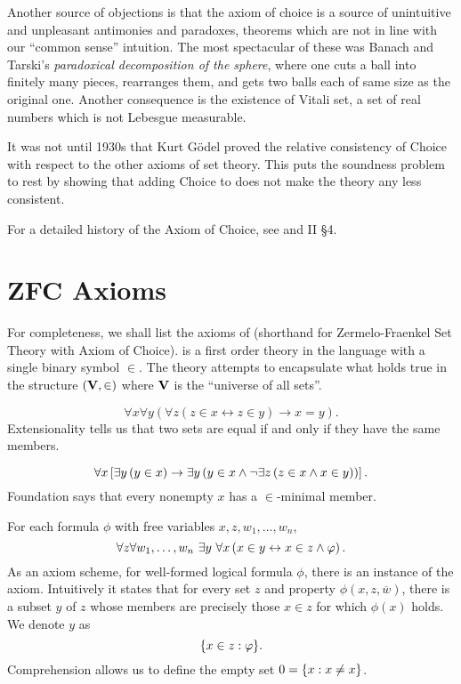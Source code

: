 Another source of objections is that the axiom of choice is a source of unintuitive and unpleasant antimonies and paradoxes,
theorems which are not in line with our ``common sense'' intuition.
The most spectacular of these was Banach and Tarski's \emph{paradoxical decomposition of the sphere},
where one cuts a ball into finitely many pieces, rearranges them, and gets two balls each of same size as the original one.
Another consequence is the existence of Vitali set, a set of real numbers which is not Lebesgue measurable.

It was not until 1930s that Kurt Gödel proved the relative consistency of Choice with respect to the other axioms of set theory.
This puts the soundness problem to rest by showing that adding Choice to \ZF does not make the theory any less consistent.

For a detailed history of the Axiom of Choice, see \autocite{moore1982} and \autocite{fraenkel1973} II \S 4.


\section{ZFC Axioms}

For completeness, we shall list the axioms of \ZFC (shorthand for Zermelo-Fraenkel Set Theory with Axiom of Choice).
\ZFC is a first order theory in the language with a single binary symbol \(\in\).
The theory attempts to encapsulate what holds true in the structure \((\mathbf{V},\in)\) where \(\mathbf{V}\) is the ``universe of all sets''.

\begin{axiom}[Extensionality]
    \[ \forall x \forall y \left( \forall z\left(z\in x\leftrightarrow z\in y\right) \rightarrow x = y \right). \]
    Extensionality tells us that two sets are equal if and only if they have the same members.
\end{axiom}

\begin{axiom}[Foundation]
    \[ \forall x \left[  \exists y \left(y\in x\right) \to \exists y \left(y\in x\land \lnot\exists z\left(z\in x\land x\in y\right)\right)  \right] .\]
    Foundation says that every nonempty \(x\) has a \(\in\)-minimal member.
\end{axiom}

\begin{axiom}
    For each formula \(\phi\) with free variables \(x,z,w_1,\dots,w_n\),
    \[ \forall z \forall w_1,\dots,w_n\ \exists y\ \forall x\paren{x\in y\leftrightarrow x\in z\land \phi}. \]
    As an axiom scheme, for well-formed logical formula \(\phi\), there is an instance of the axiom.
    Intuitively it states that for every set \(z\) and property \(\phi(x, z, \overline{w})\), there is a subset \(y\) of \(z\) whose members are precisely those \(x\in z\) for which \(\phi(x)\) holds. We denote \(y\) as \[ {\left\{ x\in z: \varphi \right\}} .\]
    Comprehension allows us to define the empty set \(0 = {\left\{ x: x\ne x \right\}}\).
\end{axiom}

